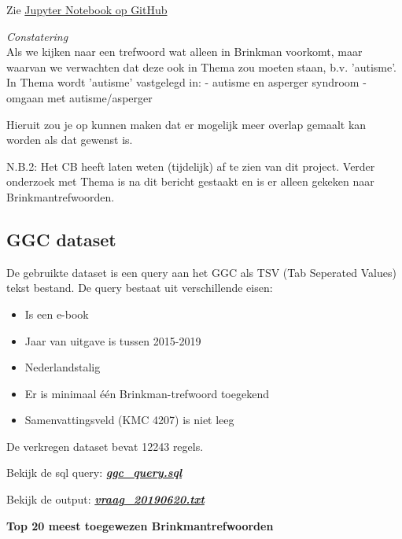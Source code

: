 \documentclass{article}
\begin{document}

Zie \href{https://github.com/KBNLresearch/Annif_data_exp/blob/master/compare_Brinkman_and_Thema.ipynb}{Jupyter Notebook op GitHub}


\textit{Constatering} \\
Als we kijken naar een trefwoord wat alleen in Brinkman voorkomt, maar waarvan we verwachten dat deze ook in Thema zou moeten staan, b.v. 'autisme'.
In Thema wordt 'autisme' vastgelegd in:
- autisme en asperger syndroom
- omgaan met autisme/asperger

Hieruit zou je op kunnen maken dat er mogelijk meer overlap gemaalt kan worden als dat gewenst is.

N.B.2: Het CB heeft laten weten (tijdelijk) af te zien van dit project. Verder onderzoek met Thema is na dit bericht gestaakt en is er alleen gekeken naar Brinkmantrefwoorden.


\subsection{GGC dataset}

De gebruikte dataset is een query aan het GGC als TSV (Tab Seperated Values) tekst bestand. De query bestaat uit verschillende eisen:

\begin{itemize}
    \item Is een e-book
    \item Jaar van uitgave is tussen 2015-2019
    \item Nederlandstalig
    \item Er is minimaal één Brinkman-trefwoord toegekend
    \item Samenvattingsveld (KMC 4207) is niet leeg
\end{itemize}

De verkregen dataset bevat 12243 regels.

\begin{shaded}
Bekijk de sql query: \quad
\href{run:resources/ggc_query.sql}{\textbf{\textit{ggc\_query.sql}}}

Bekijk de output: \quad \quad
\href{run:resources/vraag_20190620.txt}{\textbf{\textit{vraag\_20190620.txt}}}
\end{shaded}

\textbf{Top 20 meest toegewezen Brinkmantrefwoorden}
\end{document}
